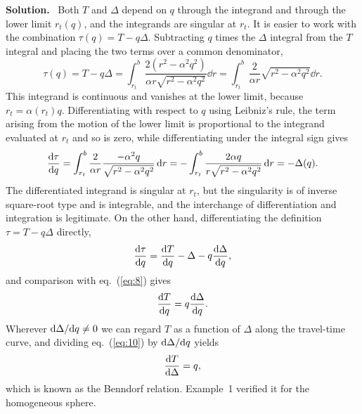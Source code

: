 \documentclass[a4paper,12pt]{paper}
\newenvironment{solution}{\par\noindent\textbf{Solution.}\ }{\par\medskip}
\begin{document}
\begin{solution}
Both $T$ and $\Delta$ depend on $q$ through the integrand and through the lower limit
$r_{t}(q)$, and the integrands are singular at $r_{t}$. It is easier to work with the
combination $\tau(q)=T-q\Delta$. Subtracting $q$ times the $\Delta$ integral from the $T$
integral and placing the two terms over a common denominator,
\begin{equation}
\tau(q)=T-q\Delta=\int_{r_{t}}^{b}\frac{2(r^{2}-\alpha^{2}q^{2})}{\alpha r\sqrt{r^{2}-\alpha^{2}q^{2}}}\dd r
=\int_{r_{t}}^{b}\frac{2}{\alpha r}\sqrt{r^{2}-\alpha^{2}q^{2}}\dd r.
\label{eq:7}
\end{equation}
This integrand is continuous and vanishes at the lower limit, because $r_{t}=\alpha(r_{t})q$.
Differentiating with respect to $q$ using Leibniz's rule, the term arising from the motion of
the lower limit is proportional to the integrand evaluated at $r_{t}$ and so is zero, while
differentiating under the integral sign gives
\begin{equation}
\frac{\mathrm{d}\tau}{\mathrm{d} q}=\int_{r_{t}}^{b}\frac{2}{\alpha r}\frac{-\alpha^{2}q}{\sqrt{r^{2}-\alpha^{2}q^{2}}}\,\mathrm{d} r
=-\int_{r_{t}}^{b}\frac{2\alpha q}{r\sqrt{r^{2}-\alpha^{2}q^{2}}}\,\mathrm{d} r=-\Delta(q).
\label{eq:8}
\end{equation}
The differentiated integrand is singular at $r_{t}$, but the singularity is of inverse
square-root type and is integrable, and the interchange of differentiation and integration is
legitimate. On the other hand, differentiating the definition $\tau=T-q\Delta$ directly,
\begin{equation}
\frac{\mathrm{d}\tau}{\mathrm{d} q}=\frac{\mathrm{d} T}{\mathrm{d} q}-\Delta-q\frac{\mathrm{d}\Delta}{\mathrm{d} q},
\label{eq:9}
\end{equation}
and comparison with eq.~(\ref{eq:8}) gives
\begin{equation}
\frac{\mathrm{d} T}{\mathrm{d} q}=q\frac{\mathrm{d}\Delta}{\mathrm{d} q}.
\label{eq:10}
\end{equation}
Wherever $\mathrm{d}\Delta/\mathrm{d} q\neq0$ we can regard $T$ as a function of $\Delta$ along the
travel-time curve, and dividing eq.~(\ref{eq:10}) by $\mathrm{d}\Delta/\mathrm{d} q$ yields
\begin{equation}
\frac{\mathrm{d} T}{\mathrm{d}\Delta}=q,
\label{eq:11}
\end{equation}
which is known as the Benndorf relation. Example~1 verified it for the homogeneous sphere.


\end{solution}
\end{document}
